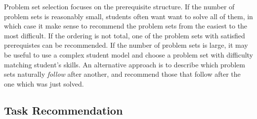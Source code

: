 
Problem set selection focuses on the prerequisite structure.
If the number of problem sets is reasonably small, students often want
want to solve all of them, in which case it make sense to recommend the problem
sets from the easiest to the most difficult.
If the ordering is not total, one of the problem sets with satisfied prerequistes
can be recommended.
If the number of problem sets is large, it may be useful to use a complex student model
and choose a problem set with difficulty matching student's skills.
An alternative approach is to describe which problem sets naturally \emph{follow} after another,
and recommend those that follow after the one which was just solved.


\subsection{Task Recommendation}  %
\label{sec:task-recommendation}


